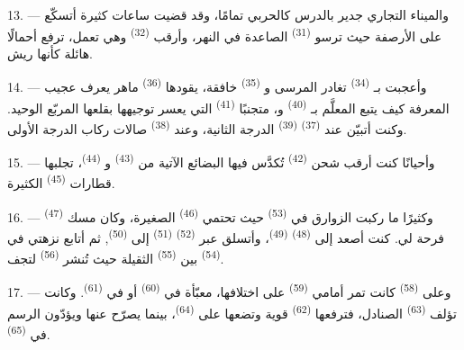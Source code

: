 13. --- والميناء التجاري جدير بالدرس كالحربي تمامًا، وقد قضيت ساعات كثيرة
أتسكّع على الأرصفة حيث ترسو  \textsuperscript{(31)}
الصاعدة في النهر، وأرقب  \textsuperscript{(32)}
وهي تعمل، ترفع أحمالًا هائلة كأنها ريش.

\VUsaut{4.0mm}
\VUsaut{3.0mm}

14. --- وأعجبت بـ \textsuperscript{(34)} تغادر
المرسى و \textsuperscript{(35)} خافقة، يقودها 
\textsuperscript{(36)} ماهر يعرف عجيب المعرفة كيف يتبع  المعلَّم
بـ \textsuperscript{(40)} و، متجنبًا
 \textsuperscript{(41)} التي يعسر توجيهها بقلعها المربّع
الوحيد. وكنت أتبيّن عند  \textsuperscript{(37)} 
\textsuperscript{(39)} الدرجة الثانية، وعند  \textsuperscript{(38)}
صالات ركاب الدرجة الأولى.

15. --- وأحيانًا كنت أرقب شحن  \textsuperscript{(42)} تُكدَّس
فيها البضائع الآتية من  \textsuperscript{(43)} و \textsuperscript{(44)}، تجلبها قطارات 
\textsuperscript{(45)} الكثيرة.

\VUsaut{3.0mm}
\VUsaut{3.0mm}

16. --- وكثيرًا ما ركبت الزوارق في  \textsuperscript{(53)}
حيث تحتمي  \textsuperscript{(46)} الصغيرة، وكان مسك
 \textsuperscript{(47)} فرحة لي. كنت أصعد إلى 
\textsuperscript{(48)}  \textsuperscript{(49)}، وأتسلق
عبر  \textsuperscript{(52)} 
\textsuperscript{(51)} إلى  \textsuperscript{(50)}, ثم أتابع نزهتي في 
\textsuperscript{(54)} بين  \textsuperscript{(55)} الثقيلة حيث
تُنشر  \textsuperscript{(56)} لتجف.

17. --- وعلى  \textsuperscript{(58)} كانت تمر أمامي
 \textsuperscript{(59)} على اختلافها، معبّأة في 
\textsuperscript{(60)} أو في  \textsuperscript{(61)}. وكانت تؤلف
 \textsuperscript{(63)} الصنادل، فترفعها 
\textsuperscript{(62)} قوية وتضعها على  \textsuperscript{(64)}، بينما
يصرّح عنها  ويؤدّون الرسم في 
\textsuperscript{(65)}.

